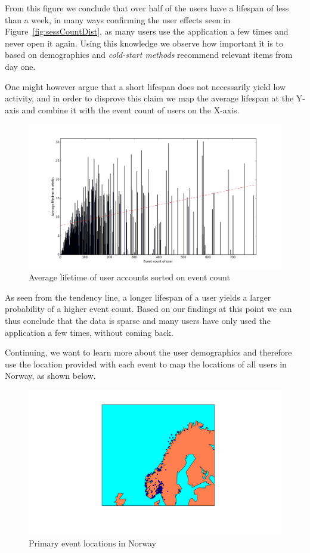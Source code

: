 From this figure we conclude that over half of the users have a lifespan of
less than a week, in many ways confirming the user effects seen in
Figure~\ref{fig:sessCountDist}, as many users use the application a few times
and never open it again. Using this knowledge we observe how important it is to
based on demographics and \textit{cold-start methods} recommend relevant items
from day one.

One might however argue that a short lifespan does not necessarily yield low
activity, and in order to disprove this claim we map the average lifespan at
the Y-axis and combine it with the event count of users on the X-axis.

\begin{figure}[H]
  \includegraphics[width=5in]{image/avglifetimeoncountuser.png}
  \centering
  \caption{Average lifetime of user accounts sorted on event count}
  \label{figure:avglifetimeoncountuser}
\end{figure}

As seen from the tendency line, a longer lifespan of a user yields a larger
probability of a higher event count. Based on our findings at this point we can
thus conclude that the data is sparse and many users have only used the
application a few times, without coming back.

Continuing, we want to learn more about the user demographics and therefore use
the location provided with each event to map the locations of all users in
Norway, as shown below.


\begin{figure}[H]
  \includegraphics[width=5in]{image/simpleGeoPlotNorway.png}
  \centering
  \caption{Primary event locations in Norway}
  \label{figure:croppedGeoplot}
\end{figure}

